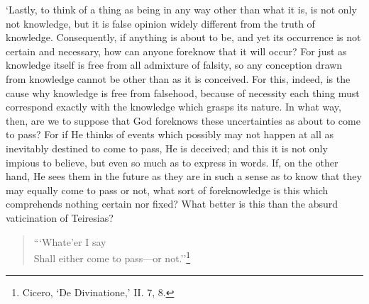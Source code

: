\documentclass[12pt]{book}
\begin{document}
`Lastly, to think of a thing as being in any way other than what it is,
is not only not knowledge, but it is false opinion widely different from
the truth of knowledge. Consequently, if anything is about to be, and
yet its occurrence is not certain and necessary, how can anyone foreknow
that it will occur? For just as knowledge itself is free from all
admixture of falsity, so any conception drawn from knowledge cannot be
other than as it is conceived. For this, indeed, is the cause why
knowledge is free from falsehood, because of necessity each thing must
correspond exactly with the knowledge which grasps its nature. In what
way, then, are we to suppose that God foreknows these uncertainties as
about to come to pass? For if He thinks of events which possibly may not
happen at all as inevitably destined to come to pass, He is deceived;
and this it is not only impious to believe, but even so much as to
express in words. If, on the other hand, He sees them in the future as
they are in such a sense as to know that they may equally come to pass
or not, what sort of foreknowledge is this which comprehends nothing
certain nor fixed? What better is this than the absurd vaticination of
Teiresias?

\begin{quote}
      ```Whate'er I say \\
    Shall either come to pass---or not.''\footnote{Cicero, ‘De Divinatione,’ II. 7, 8.}
\end{quote}
\end{document}
